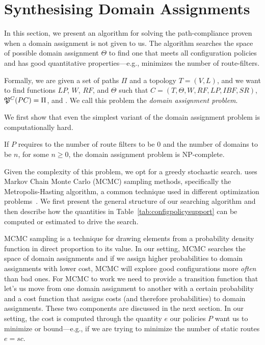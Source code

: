 \section{Synthesising Domain Assignments}
\label{sec:synth-dom-ass}

In this section, we present an algorithm for 
solving the path-compliance proven when a domain assignment is not given to us.
The algorithm searches the space of possible domain assignment $\Theta$ to find
one that meets all configuration policies and has good quantitative properties---e.g., minimizes
the number of route-filters.

Formally, we are given a set of paths $\Pi$ and 
a topology $T=(V,L)$,
and we want to find functions
$LP$, $W$, $RF$,  and $\Theta$ such that
$C=(T,\Theta,W,RF,LP,IBF,SR)$,
$\mathfrak{P}^C(PC) = \Pi$, and
.
We call this problem the \emph{domain assignment problem}.


We first show that even the simplest variant of the domain assignment problem
is computationally hard.
\begin{theorem}
If $P$ requires to the number of route filters to be 0
and the number of domains to be $n$, for some $n\geq 0$,
the domain assignment problem is NP-complete.
\end{theorem}

Given the complexity of this problem, we opt for a greedy
stochastic search.
\name uses Markov
Chain Monte Carlo (MCMC) sampling methods, specifically the Metropolis-Hasting
algorithm, a common technique used in different optimization 
problems~\cite{stoke}. 
We first present the general structure of our searching algorithm and 
then describe how the quantities in Table~\ref{tab:configpolicysupport} can be computed
or estimated to drive the search.

MCMC sampling is a technique for 
drawing elements from a
probability density function in direct proportion to its value.
In our setting, MCMC searches the space of domain assignments and
if we assign higher probabilities to domain assignments with lower cost, MCMC will explore
good configurations more \emph{often} than bad ones.
For MCMC to work we need to provide a transition function that let's us move from one domain assignment
to another with a certain probability and a cost function that assigns costs (and therefore probabilities) to
domain assignments. These two components are discussed in the next section.
In our setting, the cost is computed through the quantity $e$ our policies $P$ want us to minimize or bound---e.g.,
if we are trying to minimize the number of static routes $e=sc$.



